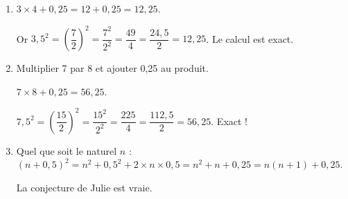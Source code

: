 
\bigskip
 
% 
%

\begin{enumerate}
\item %
$3 \times 4  + 0,25 = 12 + 0,25 = 12,25$.

Or $3,5^2 = \left(\dfrac{7}{2} \right)^2 = \dfrac{7^2}{2^2} = \dfrac{49}{4} = \dfrac{24,5}{2} = 12,25$. Le calcul est exact. 
\item %
Multiplier 7 par 8 et ajouter 0,25 au produit.

$7 \times 8 + 0,25 = 56,25$.

$7,5^2 = \left(\dfrac{15}{2} \right)^2 = \dfrac{15^2}{2^2} = \dfrac{225}{4} = \dfrac{112,5}{2} = 56,25$. Exact ! 
\item %


Quel que soit le naturel $n$ : $(n + 0,5)^2 = n^2 + 0,5^2 + 2 \times n \times 0,5 = n^2 + n + 0,25 = n(n + 1) + 0,25$.

La  conjecture de Julie est vraie.
\end{enumerate} 

\bigskip

